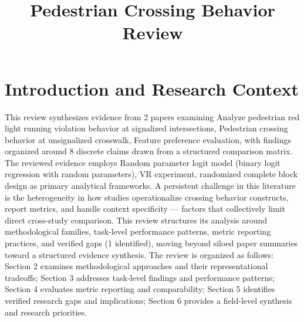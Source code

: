 \documentclass{article}
\title{Pedestrian Crossing Behavior Review}
\begin{document}
\maketitle
\section{Introduction and Research Context}
This review synthesizes evidence from 2 papers examining Analyze pedestrian red light running violation behavior at signalized intersections, Pedestrian crossing behavior at unsignalized crosswalk, Feature preference evaluation, with findings organized around 8 discrete claims drawn from a structured comparison matrix. The reviewed evidence employs Random parameter logit model (binary logit regression with random parameters), VR experiment, randomized complete block design as primary analytical frameworks. A persistent challenge in this literature is the heterogeneity in how studies operationalize crossing behavior constructs, report metrics, and handle context specificity — factors that collectively limit direct cross-study comparison. This review structures its analysis around methodological families, task-level performance patterns, metric reporting practices, and verified gaps (1 identified), moving beyond siloed paper summaries toward a structured evidence synthesis. The review is organized as follows: Section 2 examines methodological approaches and their representational tradeoffs; Section 3 addresses task-level findings and performance patterns; Section 4 evaluates metric reporting and comparability; Section 5 identifies verified research gaps and implications; Section 6 provides a field-level synthesis and research priorities.
\end{document}
